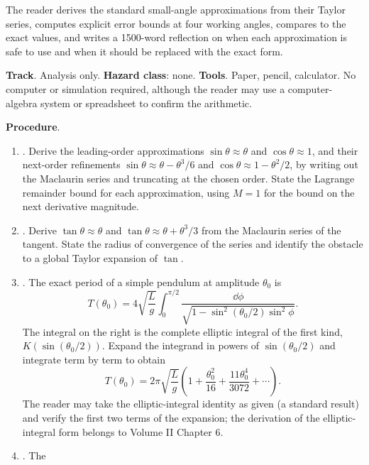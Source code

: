 \begin{project}
The reader derives the standard small-angle approximations from their
Taylor series, computes explicit error bounds at four working angles,
compares to the exact values, and writes a 1500-word reflection on
when each approximation is safe to use and when it should be replaced
with the exact form.

\textbf{Track}. Analysis only. \textbf{Hazard class}: none.
\textbf{Tools}. Paper, pencil, calculator. No computer or simulation
required, although the reader may use a computer-algebra system or
spreadsheet to confirm the arithmetic.

\textbf{Procedure}.

\begin{enumerate}[leftmargin=*]
  \item {}. Derive the leading-order
    approximations $\sin \theta \approx \theta$ and $\cos \theta
    \approx 1$, and their next-order refinements $\sin \theta \approx
    \theta - \theta^{3}/6$ and $\cos \theta \approx 1 - \theta^{2}/2$,
    by writing out the Maclaurin series and truncating at the chosen
    order. State the Lagrange remainder bound for each approximation,
    using $M = 1$ for the bound on the next derivative magnitude.
  \item {}. Derive $\tan \theta \approx \theta$ and
    $\tan \theta \approx \theta + \theta^{3}/3$ from the Maclaurin
    series of the tangent. State the radius of convergence of the
    series and identify the obstacle to a global Taylor expansion of
    $\tan$.
  \item {}. The exact period of a
    simple pendulum at amplitude $\theta_{0}$ is
    \[
    T(\theta_{0}) = 4 \sqrt{\frac{L}{g}} \int_{0}^{\pi/2}
    \frac{\dd \phi}{\sqrt{1 - \sin^{2}(\theta_{0}/2) \sin^{2} \phi}}.
    \]
    The integral on the right is the complete elliptic integral of
    the first kind, $K(\sin(\theta_{0}/2))$. Expand the integrand in
    powers of $\sin(\theta_{0}/2)$ and integrate term by term to
    obtain
    \[
    T(\theta_{0}) = 2 \pi \sqrt{\frac{L}{g}}\left(1
    + \frac{\theta_{0}^{2}}{16} + \frac{11 \theta_{0}^{4}}{3072}
    + \cdots\right).
    \]
    The reader may take the elliptic-integral identity as given (a
    standard result) and verify the first two terms of the expansion;
    the derivation of the elliptic-integral form belongs to Volume II
    Chapter 6.
  \item {}. The

\end{enumerate}
\end{project}
